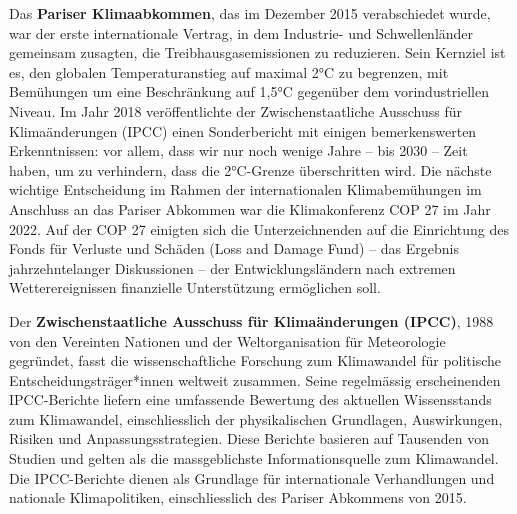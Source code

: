 \documentclass[
  nswissgerman,
  a4paper,
  DIV=11,
  numbers=noendperiod,
  oneside,
  openany]{scrreprt}
\begin{document}
Das \textbf{Pariser Klimaabkommen}, das im Dezember 2015 verabschiedet
wurde, war der erste internationale Vertrag, in dem Industrie- und
Schwellenländer gemeinsam zusagten, die Treibhausgasemissionen zu
reduzieren. Sein Kernziel ist es, den globalen Temperaturanstieg auf
maximal 2°C zu begrenzen, mit Bemühungen um eine Beschränkung auf 1,5°C
gegenüber dem vorindustriellen Niveau. Im Jahr 2018 veröffentlichte der
Zwischenstaatliche Ausschuss für Klimaänderungen (IPCC) einen
Sonderbericht mit einigen bemerkenswerten Erkenntnissen: vor allem, dass
wir nur noch wenige Jahre -- bis 2030 -- Zeit haben, um zu verhindern,
dass die 2°C-Grenze überschritten wird. Die nächste wichtige
Entscheidung im Rahmen der internationalen Klimabemühungen im Anschluss
an das Pariser Abkommen war die Klimakonferenz COP 27 im Jahr 2022. Auf
der COP 27 einigten sich die Unterzeichnenden auf die Einrichtung des
Fonds für Verluste und Schäden (Loss and Damage Fund) -- das Ergebnis
jahrzehntelanger Diskussionen -- der Entwicklungsländern nach extremen
Wetterereignissen finanzielle Unterstützung ermöglichen soll.

\begin{tcolorbox}[enhanced jigsaw, arc=.35mm, bottomrule=.15mm, bottomtitle=1mm, breakable, colback=white, colbacktitle=quarto-callout-note-color!10!white, colframe=quarto-callout-note-color-frame, coltitle=black, left=2mm, leftrule=.75mm, opacityback=0, opacitybacktitle=0.6, rightrule=.15mm, title={Der Zwischenstaatliche Ausschuss für Klimaänderungen (IPCC)}, titlerule=0mm, toprule=.15mm, toptitle=1mm]

Der \textbf{Zwischenstaatliche Ausschuss für Klimaänderungen (IPCC)},
1988 von den Vereinten Nationen und der Weltorganisation für
Meteorologie gegründet, fasst die wissenschaftliche Forschung zum
Klimawandel für politische Entscheidungsträger*innen weltweit zusammen.
Seine regelmässig erscheinenden IPCC-Berichte liefern eine umfassende
Bewertung des aktuellen Wissensstands zum Klimawandel, einschliesslich
der physikalischen Grundlagen, Auswirkungen, Risiken und
Anpassungsstrategien. Diese Berichte basieren auf Tausenden von Studien
und gelten als die massgeblichste Informationsquelle zum Klimawandel.
Die IPCC-Berichte dienen als Grundlage für internationale Verhandlungen
und nationale Klimapolitiken, einschliesslich des Pariser Abkommens von
2015.

\end{tcolorbox}
\end{document}
